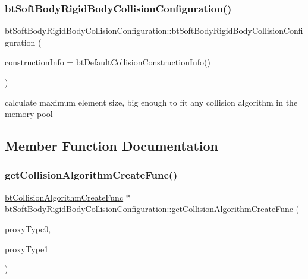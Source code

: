 \subsubsection{\texorpdfstring{bt\+Soft\+Body\+Rigid\+Body\+Collision\+Configuration()}{btSoftBodyRigidBodyCollisionConfiguration()}}
{\footnotesize\ttfamily bt\+Soft\+Body\+Rigid\+Body\+Collision\+Configuration\+::bt\+Soft\+Body\+Rigid\+Body\+Collision\+Configuration (\begin{DoxyParamCaption}\item[{const \hyperlink{structbtDefaultCollisionConstructionInfo}{bt\+Default\+Collision\+Construction\+Info} \&}]{construction\+Info = {\ttfamily \hyperlink{structbtDefaultCollisionConstructionInfo}{bt\+Default\+Collision\+Construction\+Info}()} }\end{DoxyParamCaption})}

calculate maximum element size, big enough to fit any collision algorithm in the memory pool 

\subsection{Member Function Documentation}
\mbox{\label{classbtSoftBodyRigidBodyCollisionConfiguration_a81be88bc433469b4703fc0fb9d504a50}} 
\subsubsection{\texorpdfstring{get\+Collision\+Algorithm\+Create\+Func()}{getCollisionAlgorithmCreateFunc()}}
{\footnotesize\ttfamily \hyperlink{structbtCollisionAlgorithmCreateFunc}{bt\+Collision\+Algorithm\+Create\+Func} $\ast$ bt\+Soft\+Body\+Rigid\+Body\+Collision\+Configuration\+::get\+Collision\+Algorithm\+Create\+Func (\begin{DoxyParamCaption}\item[{int}]{proxy\+Type0,  }\item[{int}]{proxy\+Type1 }\end{DoxyParamCaption})\hspace{0.3cm}{\ttfamily [virtual]}}



